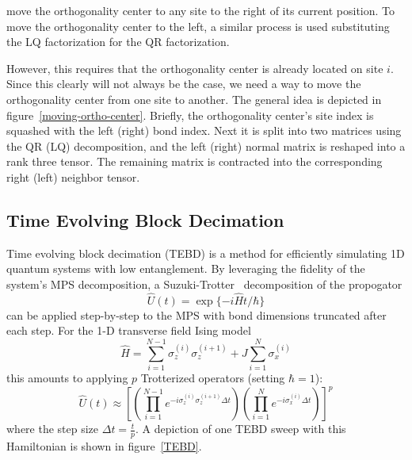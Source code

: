 \documentclass[12pt]{article}
\newenvironment{Figure}
  {\par\medskip\noindent\minipage{\linewidth}}
  {\endminipage\par\medskip}
\begin{document}
\begin{multicols}{2}
\begin{Figure}
{{		 move the orthogonality center to any site to the right of its
		 current position. To move the orthogonality center to the left,
		 a similar process is used substituting the LQ factorization for
		 the QR factorization.}}
		\label{moving-ortho-center}
	\end{Figure}
	However, this requires that the orthogonality center is already
	located on site $i$. Since this clearly will not always be the case,
	we need a way to move the orthogonality center from one site to another.
	The general idea is depicted in figure~\ref{moving-ortho-center}.
	Briefly, the orthogonality center's site index is squashed with the
	left (right) bond index. Next it is split into two matrices
	using the QR (LQ) decomposition, and the left (right) normal matrix
	is reshaped into a rank three tensor. The remaining matrix is
	contracted into the corresponding right (left) neighbor tensor.



	\subsection{Time Evolving Block Decimation}
	Time evolving block decimation (TEBD) is a method for efficiently
	simulating 1D quantum systems with low entanglement. By leveraging
	the fidelity of the system's MPS decomposition, a
	Suzuki-Trotter~\cite{suzuki}
	decomposition of the propogator
	$$\hat{U}(t)=\exp\{-i\hat{H}t/\hbar\}$$
	can be applied step-by-step to the MPS with bond dimensions truncated
	after each step. For the 1-D transverse field Ising model
	$$\hat{H}=\sum_{i=1}^{N-1}\sigma_z^{(i)}\sigma_z^{(i+1)}+J\sum_{i=1}^N\sigma_x^{(i)}$$
	this amounts to applying $p$ Trotterized operators (setting $\hbar=1$):
	\[
		\hat{U}(t) \approx
		\left[
			\left(\prod_{i=1}^{N-1}
				e^{-i\sigma_z^{(i)}\sigma_z^{(i+1)}\Delta t}
			\right)
			\left(\prod_{i=1}^Ne^{-i\sigma_x^{(i)}\Delta t}\right)
		\right]^p
	\]
	where the step size $\Delta t=\frac{t}{p}$. A depiction of one TEBD
	sweep with this Hamiltonian is shown in figure~\ref{TEBD}.


\end{multicols}
\end{document}
